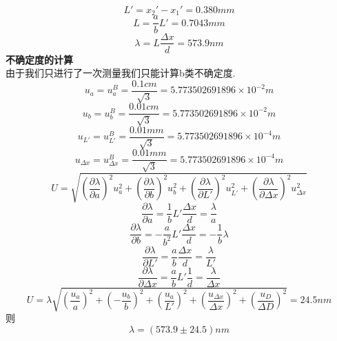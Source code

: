 \documentclass[10pt, a4paper]{article}
\begin{document}
    \[L' = x_2'- x_1' = 0.380mm\]
    \[L = \frac{a}{b}L' = 0.7043mm\]
    \[\lambda = L\frac{\Delta x}{d} = 573.9nm\]
    \textbf{不确定度的计算}\\
    由于我们只进行了一次测量我们只能计算b类不确定度.\\
    \[u_a=u_{a}^B = \frac{0.1cm}{\sqrt{3}} = 5.773502691896\times10^{-2}m\]
    \[u_b=u_{b}^B = \frac{0.01cm}{\sqrt{3}} = 5.773502691896\times10^{-2}m\]
    \[u_{L'}=u_{L'}^B = \frac{0.01mm}{\sqrt{3}} = 5.773502691896\times10^{-4}m\]
    \[u_{\Delta x} =u_{\Delta x}^B= \frac{0.01mm}{\sqrt{3}} = 5.773502691896\times10^{-4}m\]
    \[U = \sqrt{(\frac{\partial\lambda}{\partial a})^2u_a^2 + (\frac{\partial\lambda}{\partial b})^2u_b^2  + (\frac{\partial\lambda}{\partial L'})^2u_{L'}^2 +(\frac{\partial\lambda}{\partial \Delta x})^2u_{\Delta x}^2} \]
    \[\frac{\partial\lambda}{\partial a} = \frac{1}{b}L'\frac{\Delta x}{d} = \frac{\lambda}{a}\]
    \[\frac{\partial\lambda}{\partial b} = -\frac{a}{b^2}L'\frac{\Delta x}{d} = -\frac{1}{b}\lambda\]
    \[\frac{\partial\lambda}{\partial L'} = \frac{a}{b}\frac{\Delta x}{d} = \frac{\lambda}{L'}\]
    \[\frac{\partial\lambda}{\partial \Delta x} = \frac{a}{b}L'\frac{1}{d} = \frac{\lambda}{\Delta x}\]
    \[U = \lambda\sqrt{(\frac{u_a}{a})^2+(-\frac{u_b}{b})^2+(\frac{u_a}{L'})^2+(\frac{u_{\Delta x}}{\Delta x})^2+(\frac{u_{D}}{\Delta D})^2}=24.5nm\]
    则\[\lambda = (573.9\pm24.5)nm\]
\end{document}
